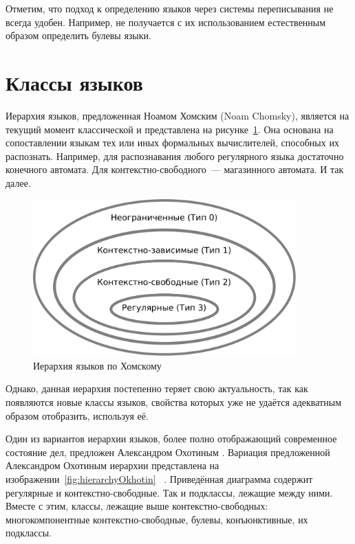 Отметим, что подход к определению языков через системы переписывания не всегда удобен. Например, не получается с их использованием естественным образом определить булевы языки.

\section{Классы языков}

Иерархия языков, предложенная Ноамом Хомским (Noam Chomsky), является на текущий момент классической и представлена на рисунке~\ref{fig:Chomsky}.
Она основана на сопоставлении языкам тех или иных формальных вычислителей, способных их распознать.
Например, для распознавания любого регулярного языка достаточно конечного автомата. Для контекстно-свободного~--- магазинного автомата. И так далее.

\begin{figure}
    \caption{Иерархия языков по Хомскому}
    \label{fig:Chomsky}
    \begin{center}
        \includegraphics[width=0.9\textwidth]{figures/Chomsky.pdf}
    \end{center}
\end{figure}

Однако, данная иерархия постепенно теряет свою актуальность, так как появляются новые классы языков, свойства которых уже не удаётся адекватным образом отобразить, используя её.

Один из вариантов иерархии языков, более полно отображающий современное состояние дел, предложен Александром Охотиным%
.
Вариация предложенной Александром Охотиным иерархии представлена на изображении~\ref{fig:hierarchyOkhotin}~
.
Приведённая диаграмма содержит регулярные и контекстно-свободные.
Так и подклассы, лежащие между ними.
Вместе с этим, классы, лежащие выше контекстно-свободных: многокомпонентные контекстно-свободные, булевы, конъюнктивные, их подклассы.

